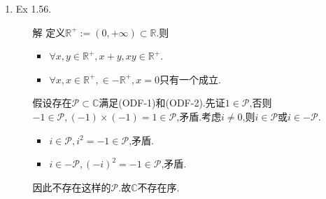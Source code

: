 \documentclass[12pt, a4paper]{article}
\begin{document}
\begin{enumerate}
\begin{proof}
        设\(\{x_n\}\)是Cauchy列,对每个\(n\)取RCS\(\{a_{n, k}\}_{k = 1}^{\infty}\)使得\(x_n = \{a_{n, k}\}\).且\(\exists K_n\)使当\(k \geq K_n\)时有
        \[|a_{n, k} - x_n| < \frac{1}{n}.\]
        下证\(\{b_n\} = \{a_{n, K_n}\}\)是RCS.任意\(\varepsilon > 0\),由\(\{x_n\}\)是Cauchy列知\(\exists N\)使当\(m, n > N\)时,\(|x_m - x_n| < \varepsilon\).又因为当\(k \geq K_n\)时有
        \[|a_{n, k} - x_n| < \frac{1}{n},\]
        取\(M = \max\left\{N, \dfrac{1}{\varepsilon}\right\}\),当\(m, n > M\)时,\(k \geq K_n\)且\(k \geq K_m\),因此
        \[\begin{aligned}
            |b_n - b_m| & = |a_{n, K_n} - a_{m, K_m}| \\
            & \leq |a_{n, K_n} - x_n| + |x_n - x_m| + |x_m - a_{m, K_m}| \\
            & < 3\varepsilon.
        \end{aligned}\]
        于是\(\{b_n\}\)是RCS,设\(x = \{b_n\}\),则\(\lim\limits_{x \to \infty} |b_n - x| = 0\).\(\forall \varepsilon > 0, \exists N'\)使当\(n > N'\)时,\(|b_n - x| < \varepsilon\).取\(M' = \max\left\{\frac{1}{\varepsilon}, N'\right\}\),当\(n > M'\)时,
        \[|x_n - x| \leq |x_n - b_n| + |b_n - x| < 2\varepsilon.\]
        故\(x_n \to x\).综上,\(\{x_n\}\)收敛于\(x \in \mathbb{R}\)当且仅当\(\{x_n\}\)是Cauchy列.
    \end{proof}
    \item Ex 1.56. \label{ex:1.56}
    \begin{itemize}
        \item[解] 定义\(\mathbb{R}^+ := (0, +\infty) \subset \mathbb{R}\).则
        \begin{itemize}
            \item \(\forall x, y \in \mathbb{R}^+, x + y, xy \in \mathbb{R}^+\).
            \item \(\forall x, x \in \mathbb{R}^+, \in -\mathbb{R}^+, x = 0\)只有一个成立.
        \end{itemize}
        假设存在\(\mathcal{P} \subset \mathbb{C}\)满足(ODF-1)和(ODF-2).先证\(1 \in \mathcal{P}\),否则\(-1 \in \mathcal{P}, (-1) \times (-1) = 1 \in \mathcal{P}\),矛盾.考虑\(i \neq 0\),则\(i \in \mathcal{P}\)或\(i \in -\mathcal{P}\).
        \begin{itemize}
            \item \(i \in \mathcal{P}, i^2 = -1 \in \mathcal{P}\),矛盾.
            \item \(i \in -\mathcal{P}, (-i)^2 = -1 \in \mathcal{P}\),矛盾.
        \end{itemize}
        因此不存在这样的\(\mathcal{P}\).故\(\mathbb{C}\)不存在序.

\end{itemize}
\end{enumerate}
\end{document}
